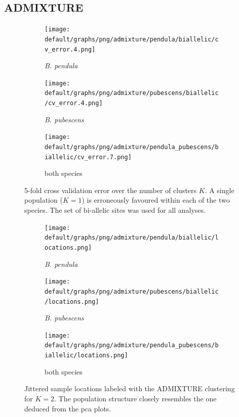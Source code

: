 \documentclass[hidelinks,11pt]{article}
\newcommand{\pendula}{\textit{B. pendula}}
\newcommand{\pubescens}{\textit{B. pubescens}}
\begin{document}
    \clearpage

    \subsection{ADMIXTURE}

    \begin{figure}[H]
        \centering
        \begin{subfigure}[b]{0.313\textwidth}
            \centering
            \texttt{[image: default/graphs/png/admixture/pendula/biallelic/cv\_error.4.png]}
            \caption{\pendula{}}
            \label{fig:admixture_cv_error_pendula}
        \end{subfigure}
        \hfill
        \begin{subfigure}[b]{0.32\textwidth}
            \centering
            \texttt{[image: default/graphs/png/admixture/pubescens/biallelic/cv\_error.4.png]}
            \caption{\pubescens{}}
            \label{fig:admixture_cv_error_pubescens}
        \end{subfigure}
        \hfill
        \begin{subfigure}[b]{0.32\textwidth}
            \centering
            \texttt{[image: default/graphs/png/admixture/pendula\_pubescens/biallelic/cv\_error.7.png]}
            \caption{both species}
            \label{fig:admixture_cv_error_both_species}
        \end{subfigure}
        \caption{5-fold cross validation error over the number of clusters $K$. A single population ($K=1$) is erroneously favoured within each of the two species. The set of bi-allelic sites was used for all analyses.}
        \label{fig:admixture_cv_error_pendula_pubescens}
    \end{figure}
    
    \begin{figure}[H]
        \centering
        \begin{subfigure}[b]{0.306\textwidth}
            \centering
            \texttt{[image: default/graphs/png/admixture/pendula/biallelic/locations.png]}
            \caption{\pendula{}}
            \label{fig:locations_admixture_pendula}
        \end{subfigure}
        \hfill
        \begin{subfigure}[b]{0.32\textwidth}
            \centering
            \texttt{[image: default/graphs/png/admixture/pubescens/biallelic/locations.png]}
            \caption{\pubescens{}}
            \label{fig:locations_admixture_pubescens}
        \end{subfigure}
        \hfill
        \begin{subfigure}[b]{0.32\textwidth}
            \centering
            \texttt{[image: default/graphs/png/admixture/pendula\_pubescens/biallelic/locations.png]}
            \caption{both species}
            \label{fig:locations_admixture_pendula_pubescens}
        \end{subfigure}
        \caption{Jittered sample locations labeled with the \mbox{ADMIXTURE} clustering for $K=2$. The population structure closely resembles the one deduced from the \acrshort{pca} plots.}
        \label{fig:locations_admixture}
    \end{figure}
\end{document}
